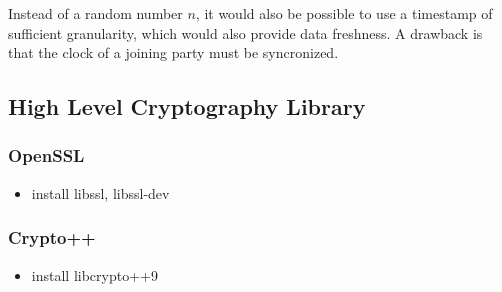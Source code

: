 Instead of a random number $n$, it would also be possible to use a timestamp of sufficient granularity, which would also provide data freshness.
A drawback is that the clock of a joining party must be syncronized.

\subsection{High Level Cryptography Library}

\subsubsection{OpenSSL}

\begin{itemize}
 \item install libssl, libssl-dev
\end{itemize}

\subsubsection{Crypto++}
\begin{itemize}
 \item install  libcrypto++9
\end{itemize}